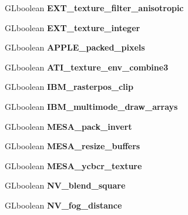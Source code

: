 \begin{DoxyCompactItemize}
G\+Lboolean {\bfseries E\+X\+T\+\_\+texture\+\_\+filter\+\_\+anisotropic}
\item 
\mbox{\label{structgl__extensions_a28414e15b03580d88b5be2233dad3580}} 
G\+Lboolean {\bfseries E\+X\+T\+\_\+texture\+\_\+integer}
\item 
\mbox{\label{structgl__extensions_a9f457b0c8c9bbe3a0be0ab23fc5f0a32}} 
G\+Lboolean {\bfseries A\+P\+P\+L\+E\+\_\+packed\+\_\+pixels}
\item 
\mbox{\label{structgl__extensions_a72cab83f85ce630fc7b5faa9e3ce8cb5}} 
G\+Lboolean {\bfseries A\+T\+I\+\_\+texture\+\_\+env\+\_\+combine3}
\item 
\mbox{\label{structgl__extensions_afe8921d6b430c5fc0fb26460e6474bee}} 
G\+Lboolean {\bfseries I\+B\+M\+\_\+rasterpos\+\_\+clip}
\item 
\mbox{\label{structgl__extensions_a8c12606a3aad93cd72775c8868e53804}} 
G\+Lboolean {\bfseries I\+B\+M\+\_\+multimode\+\_\+draw\+\_\+arrays}
\item 
\mbox{\label{structgl__extensions_ac567a750eab32c6cbf0d4266f11a2a7a}} 
G\+Lboolean {\bfseries M\+E\+S\+A\+\_\+pack\+\_\+invert}
\item 
\mbox{\label{structgl__extensions_ad8f4cc3b4d56703ff725a16a7720b154}} 
G\+Lboolean {\bfseries M\+E\+S\+A\+\_\+resize\+\_\+buffers}
\item 
\mbox{\label{structgl__extensions_a02e1d5849f6201fe98eaf1e004fdabe2}} 
G\+Lboolean {\bfseries M\+E\+S\+A\+\_\+ycbcr\+\_\+texture}
\item 
\mbox{\label{structgl__extensions_aad0549f841997f425d2c94c71240ae51}} 
G\+Lboolean {\bfseries N\+V\+\_\+blend\+\_\+square}
\item 
\mbox{\label{structgl__extensions_a7c709aed33709921e0ddb85cfcdb0896}} 
G\+Lboolean {\bfseries N\+V\+\_\+fog\+\_\+distance}
\item 
\mbox{\label{structgl__extensions_adf9eec4fe337bc30392cb5d65c98760f}} 

\end{DoxyCompactItemize}
